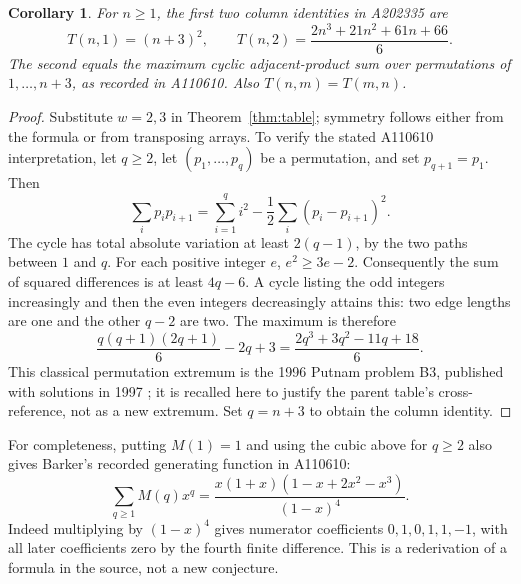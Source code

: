 \documentclass[11pt]{article}
\newtheorem{corollary}[theorem]{Corollary}
\begin{document}
\begin{corollary}\label{cor:columns}
For $n\ge1$, the first two column identities in A202335 are
\[
 T(n,1)=(n+3)^2,\qquad
 T(n,2)=\frac{2n^3+21n^2+61n+66}{6}.
\]
The second equals the maximum cyclic adjacent-product sum over permutations of $1,\ldots,n+3$, as recorded in A110610. Also $T(n,m)=T(m,n)$.
\end{corollary}
\begin{proof}
Substitute $w=2,3$ in Theorem~\ref{thm:table}; symmetry follows either from the formula or from transposing arrays. To verify the stated A110610 interpretation, let $q\ge2$, let $(p_1,\ldots,p_q)$ be a permutation, and set $p_{q+1}=p_1$. Then
\[
 \sum_i p_ip_{i+1}=\sum_{i=1}^q i^2-\frac12\sum_i(p_i-p_{i+1})^2.
\]
The cycle has total absolute variation at least $2(q-1)$, by the two paths between $1$ and $q$. For each positive integer $e$, $e^2\ge3e-2$. Consequently the sum of squared differences is at least $4q-6$. A cycle listing the odd integers increasingly and then the even integers decreasingly attains this: two edge lengths are one and the other $q-2$ are two. The maximum is therefore
\[
 \frac{q(q+1)(2q+1)}6-2q+3
   =\frac{2q^3+3q^2-11q+18}{6}.
\]
This classical permutation extremum is the 1996 Putnam problem B3, published with solutions in 1997 \cite{putnam,cyclic}; it is recalled here to justify the parent table's cross-reference, not as a new extremum. Set $q=n+3$ to obtain the column identity.
\end{proof}
For completeness, putting $M(1)=1$ and using the cubic above for $q\ge2$ also gives Barker's recorded generating function in A110610:
\[
 \sum_{q\ge1}M(q)x^q
       =\frac{x(1+x)(1-x+2x^2-x^3)}{(1-x)^4}.
\]
Indeed multiplying by $(1-x)^4$ gives numerator coefficients $0,1,0,1,1,-1$, with all later coefficients zero by the fourth finite difference. This is a rederivation of a formula in the source, not a new conjecture.
\end{document}
